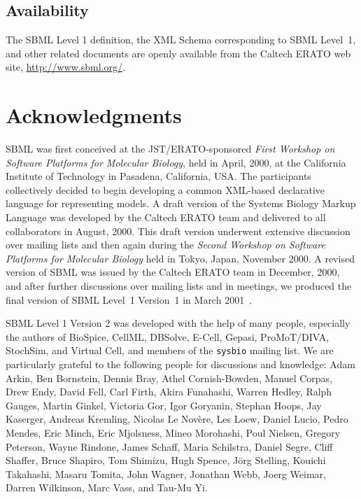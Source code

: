 \documentclass[10pt]{cekarticle}
\newcommand{\changed}[1]{\textcolor{BrickRed}{#1}}
\begin{document}
\subsection{Availability}
\label{sec:availability}

The SBML Level 1 definition, the XML Schema corresponding to SBML Level~1,
and other related documents are openly available from the Caltech ERATO web
site, \changed{\url{http://www.sbml.org/}}.



\setcounter{secnumdepth}{-1}
\section{Acknowledgments}
\label{sec:acknowledgements}

SBML was first conceived at the JST/ERATO-sponsored \emph{First Workshop on
  Software Platforms for Molecular Biology}, held in April, 2000, at the
California Institute of Technology in Pasadena, California, USA.  The
participants collectively decided to begin developing a common XML-based
declarative language for representing models.  A draft version of the
Systems Biology Markup Language was developed by the Caltech ERATO team and
delivered to all collaborators in August, 2000.  This draft version
underwent extensive discussion over mailing lists and then again during the
\emph{Second Workshop on Software Platforms for Molecular Biology} held in
Tokyo, Japan, November 2000.  A revised version of SBML was issued by the
Caltech ERATO team in December, 2000, and after further discussions over
mailing lists and in meetings, we produced the final version of SBML
Level~1 \changed{Version~1 in March 2001~\cite{hucka:2001}}.

SBML Level 1 \changed{Version 2} was developed with the help of many
people, especially the authors of BioSpice, \changed{CellML}, DBSolve,
E-Cell, Gepasi, \changed{ProMoT/DIVA}, StochSim, and Virtual Cell, and
members of the \texttt{sysbio} mailing list.  We are particularly grateful
to the following people for discussions and knowledge: \changed{Adam
  Arkin}, \changed{Ben Bornstein}, Dennis Bray, Athel Cornish-Bowden,
\changed{Manuel Corpas}, \changed{Drew Endy}, David Fell, Carl Firth,
\changed{Akira Funahashi}, Warren Hedley, \changed{Ralph Gauges}, Martin
Ginkel, \changed{Victoria Gor}, Igor Goryanin, \changed{Stephan Hoops}, Jay
Kaserger, Andreas Kremling, Nicolas Le Nov\`{e}re, Les Loew, Daniel Lucio,
Pedro Mendes, \changed{Eric Minch}, Eric Mjolsness, \changed{Mineo
  Morohashi}, \changed{Poul Nielsen}, \changed{Gregory Peterson},
\changed{Wayne Rindone}, James Schaff, \changed{Maria Schilstra},
\changed{Daniel Segre}, \changed{Cliff Shaffer}, Bruce Shapiro, Tom
Shimizu, Hugh Spence, J\"{o}rg Stelling, Kouichi Takahashi, Masaru Tomita,
John Wagner, \changed{Jonathan Webb}, \changed{Joerg Weimar},
\changed{Darren Wilkinson}, \changed{Marc Vass}, and \changed{Tau-Mu Yi}.
\end{document}
